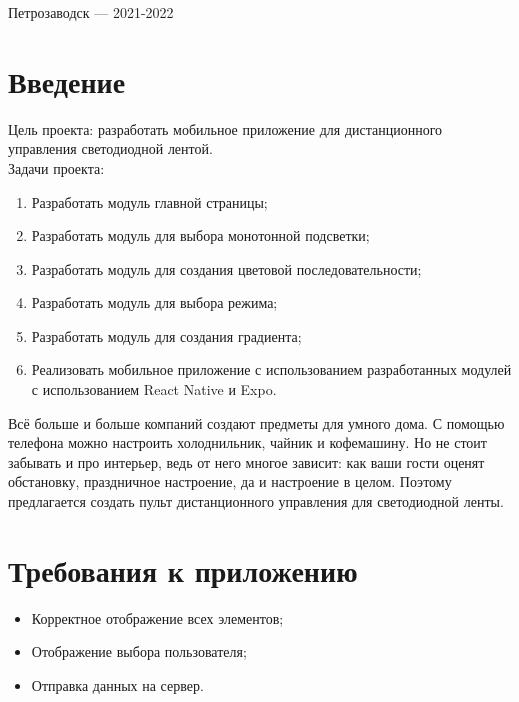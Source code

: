 \documentclass[a4paper,12pt]{article}
\begin{document}
\vfill

\begin{center}
\large
    Петрозаводск --- 2021-2022
\end{center}



\newpage

\hypersetup{hidelinks}
\tableofcontents

\newpage
\section*{Введение}


Цель проекта: разработать мобильное приложение для дистанционного управления светодиодной лентой. \\

Задачи проекта: 
\begin{enumerate}
    \item Разработать модуль главной страницы;
    \item Разработать модуль для выбора монотонной подсветки;
    \item Разработать модуль для создания цветовой последовательности;
    \item Разработать модуль для выбора режима;
    \item Разработать модуль для создания градиента;
    \item Реализовать мобильное приложение с использованием разработанных модулей с использованием React Native и Expo.
\end{enumerate}

Всё больше и больше компаний создают предметы для умного дома. С помощью телефона можно настроить холоднильник, чайник и кофемашину. Но не стоит забывать и про интерьер, ведь от него многое зависит: как ваши гости оценят обстановку, праздничное настроение, да и настроение в целом. Поэтому предлагается создать пульт дистанционного управления для светодиодной ленты.    



\section{Требования к приложению}
\begin{itemize}
    \item Корректное отображение всех элементов;
    \item Отображение выбора пользователя;
    \item Отправка данных на сервер. 
\end{itemize}
\end{document}
